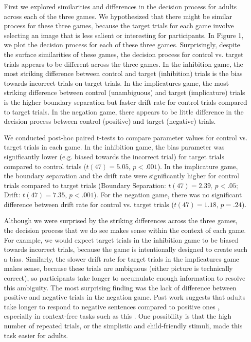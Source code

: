 \documentclass[10pt,letterpaper]{article}
\begin{document}
First we explored similarities and differences in the decision process for adults across each of the three games.  We hypothesized that there might be similar process for these three games, because the target trials for each game involve selecting an image that is less salient or interesting for participants.  In Figure 1, we plot the decision process for each of these three games.  Surprisingly, despite the surface similarities of these games, the decision process for control vs. target trials appears to be different across the three games.  In the inhibition game, the most striking difference between control and target (inhibition) trials is the bias towards incorrect trials on target trials.  In the implicatures game, the most striking difference between control (unambiguous) and target (implicature) trials is the higher boundary separation but faster drift rate for control trials compared to target trials.  In the negation game, there appears to be little difference in the decision process between control (positive) and target (negative) trials.

We conducted post-hoc paired t-tests to compare parameter values for control vs. target trials in each game.  In the inhibition game, the bias parameter was significantly lower (e.g. biased towards the incorrect trial) for target trials compared to control trials ($t(47) = 5.05$, $p< .001$).  In the implicature game, the boundary separation and the drift rate were significantly higher for control trials compared to target trials (Boundary Separation: $t(47) = 2.39$, $p< .05$; Drift: $t(47) = 7.35$, $p< .001$).  For the negation game, there was no significant difference between drift rate for control vs. target trials ($t(47) = 1.18$, $p = .24$).  

Although we were surprised by the striking differences across the three games, the decision process that we do see makes sense within the context of each game.  For example, we would expect target trials in the inhibition game to be biased towards incorrect trials, because the game is intentionally designed to create such a bias.  Similarly, the slower drift rate for target trials in the implicatures game makes sense, because these trials are ambiguous (either picture is technically correct), so participants take longer to accumulate enough information to resolve this ambiguity.  The most surprising finding was the lack of difference between positive and negative trials in the negation game.  Past work suggests that adults take longer to respond to negative sentences compared to positive ones \cite{hclark1972}, especially in context-free tasks such as this \cite{nordmeyer2014a}.  One possibility is that the high number of repeated trials, or the simplistic and child-friendly stimuli, made this task easier for adults.
\end{document}
